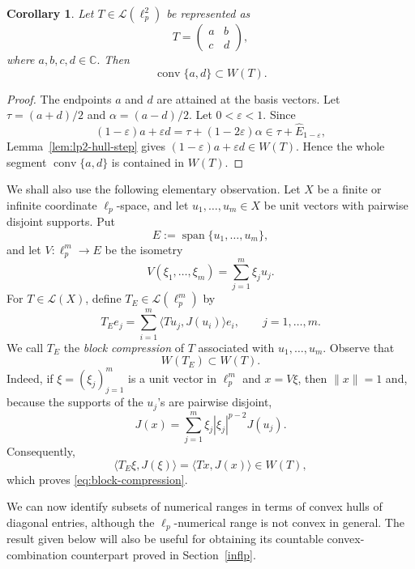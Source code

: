\documentclass[11pt]{amsart}
\numberwithin{equation}{section}
\newtheorem{corollary}[theorem]{Corollary}
\theoremstyle{definition}
\theoremstyle{remark}
\DeclareMathOperator{\conv}{conv}
\begin{document}
\begin{corollary}\label{cor:lp2-diagonal-segment}
Let $T \in \mathcal L(\ell_p^2)$ be represented as
\[
T=
\begin{pmatrix}
a & b\\
c & d
\end{pmatrix},
\]
where $a, b, c, d \in \mathbb C.$ Then
\[
\conv\{a,d\}\subset W(T).
\]
\end{corollary}

\begin{proof}
The endpoints $a$ and $d$ are attained at the basis vectors. Let
$\tau=(a+d)/2$ and $\alpha=(a-d)/2$. Let
$0<\varepsilon<1$. Since
\[
        (1-\varepsilon)a+\varepsilon d
        =
        \tau+(1-2\varepsilon)\alpha
        \in \tau+\widehat E_{1-\varepsilon},
\]
Lemma~\ref{lem:lp2-hull-step} gives
$(1-\varepsilon)a+\varepsilon d\in W(T)$. Hence the whole segment
$\operatorname{conv}\{a,d\}$ is contained in $W(T)$.
\end{proof}




We shall also use the following elementary observation. Let \(X\) be a finite
or infinite coordinate \(\ell_p\)-space, and let
\(u_1,\ldots,u_m\in X\) be unit vectors with pairwise disjoint supports.
 Put
\[
        E:=\operatorname{span}\{u_1,\ldots,u_m\},
\]
and let \(V:\ell_p^m\to E\) be the isometry
\[
        V(\xi_1,\ldots,\xi_m)=\sum_{j=1}^m \xi_j u_j .
\]
For \(T\in\mathcal L(X)\), define \(T_E\in\mathcal L(\ell_p^m)\) by
\[
        T_Ee_j=
        \sum_{i=1}^m \langle Tu_j,J(u_i)\rangle e_i,
        \qquad j=1,\ldots,m.
\]
We call \(T_E\) the \emph{block compression} of \(T\) associated with
\(u_1,\ldots,u_m\).
Observe that
\begin{equation}\label{eq:block-compression}
        W(T_E)\subset W(T).
\end{equation}
Indeed, if \(\xi=(\xi_j)_{j=1}^m\) is a unit vector in \(\ell_p^m\) and
\(x=V\xi\), then \(\|x\|=1\) and, because the supports of the \(u_j\)'s are
pairwise disjoint,
\[
        J(x)=\sum_{j=1}^m \xi_j|\xi_j|^{p-2}J(u_j).
\]
Consequently,
\[
        \langle T_E\xi,J(\xi)\rangle=\langle Tx,J(x)\rangle\in W(T),
\]
which proves \eqref{eq:block-compression}.



We can now identify subsets of numerical ranges in terms of convex hulls of
diagonal entries, although the \(\ell_p\)-numerical range is not convex in general.
The result given below will also be useful for obtaining its  countable convex-combination counterpart proved in Section~\ref{inflp}.
\end{document}
